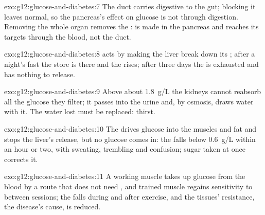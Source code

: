 \begin{solution}{exo:g12:glucose-and-diabetes:7}
The duct carries digestive  to the gut; blocking it leaves
 normal, so the pancreas's effect on glucose is not through
digestion. Removing the whole organ removes the :  is
made in the pancreas and reaches its targets through the blood, not
the duct.
\end{solution}

\begin{solution}{exo:g12:glucose-and-diabetes:8}
 acts by making the liver break down its ; after a
night's fast the store is there and the  rises; after three
days the  is exhausted and  has nothing to release.
\end{solution}

\begin{solution}{exo:g12:glucose-and-diabetes:9}
Above about \qty{1.8}{g/L} the kidneys cannot reabsorb all the glucose
they filter; it passes into the urine and, by osmosis, draws water
with it. The water lost must be replaced: thirst.
\end{solution}

\begin{solution}{exo:g12:glucose-and-diabetes:10}
The  drives glucose into the muscles and fat  and stops
the liver's release, but no glucose comes in: the  falls
below \qty{0.6}{g/L} within an hour or two, with sweating, trembling
and confusion; sugar taken at once corrects it.
\end{solution}

\begin{solution}{exo:g12:glucose-and-diabetes:11}
A working muscle takes up glucose from the blood by a route that does
not need , and trained muscle regains sensitivity to 
between sessions; the  falls during and after exercise, and
the tissues' resistance, the disease's cause, is reduced.
\end{solution}

